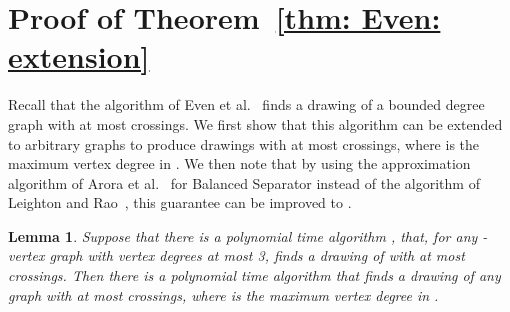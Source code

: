 \documentclass[twoside,leqno,twocolumn]{article}
\newtheorem{lemma}{Lemma}
\begin{document}
\iffull
\section{Proof of Theorem~\ref{thm: Even: extension}}
Recall that the algorithm of Even et al.~\cite{EvenGS02} finds a drawing of a bounded degree graph with at most 
crossings. We first show that this algorithm can be extended to arbitrary graphs
to produce drawings with at most  crossings, where  is the maximum vertex degree in .
We then note that by using the approximation algorithm of Arora et al.~\cite{ARV} for {\sf Balanced Separator}
instead of the algorithm of Leighton and Rao~\cite{LR}, this guarantee can be improved to .

\begin{lemma}  
Suppose that there is a polynomial time algorithm , that, for any -vertex graph  with vertex degrees at most 3, finds a drawing of  with at most  crossings. 
Then there is a polynomial time algorithm that finds a drawing of any graph  with at most  crossings, where  is the maximum vertex degree in .
\end{lemma}
\end{document}
